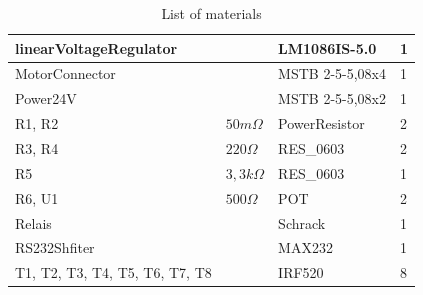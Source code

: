 \documentclass[a4paper,12pt]{scrreprt}
\begin{document}
\begin{table}[H]
\begin{tabular}{|p{5.5cm}|p{2cm}|p{5.3cm}|p{2cm}|}
linearVoltageRegulator                           			&        				& LM1086IS-5.0    & 1        \\ \hline
MotorConnector                                   				&        				& MSTB 2-5-5,08x4 & 1        \\ \hline
Power24V                                         				&        				& MSTB 2-5-5,08x2 & 1        \\ \hline
R1, R2                                           					& $50m \Omega$ 		& PowerResistor   & 2        \\ \hline
R3, R4                                           					& $220\Omega$ 		& RES\_0603       & 2        \\ \hline
R5                                               						& $3,3k\Omega$ 		& RES\_0603       & 1        \\ \hline
R6, U1                                           					& $500\Omega$ 		& POT             & 2        \\ \hline
Relais                                           						&        				& Schrack         & 1        \\ \hline
RS232Shfiter                                     				&        				& MAX232          & 1        \\ \hline
T1, T2, T3, T4, T5, T6, T7, T8                   		&        				& IRF520          & 8       \\ \hline
\end{tabular}
\caption{List of materials}
\label{tab:list of materials}
\end{table}
\end{document}

